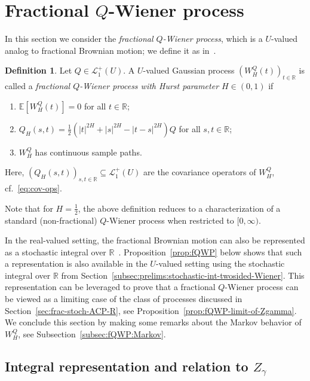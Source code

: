\documentclass[reqno]{amsart}
\numberwithin{equation}{section}
\newcommand{\bbR}{\mathbb{R}}
\newcommand{\R}{\mathbb{R}}
\newcommand{\E}{\mathbb{E}}
\newcommand{\LO}{\mathscr L}
\theoremstyle{remark}
\theoremstyle{definition}
\newtheorem{definition}[lemma]{Definition}
\begin{document}
\section{Fractional $Q$-Wiener process}
\label{sec:frac-QWiener}
In this section we consider the \emph{fractional $Q$-Wiener process}, 
which is a $U$-valued analog to 
fractional Brownian motion; 
we define it as in~\cite[Definition~2.1]{Duncan2002}.
%
\begin{definition}\label{def:fQWP}
	Let $Q \in \LO_1^+(U)$.
	A $U$-valued Gaussian process $(W^Q_H(t))_{t\in\R}$ is called a \emph{fractional $Q$-Wiener process
		with Hurst parameter $H \in (0, 1)$} if
	\begin{enumerate}[label=(f-WP\arabic*), leftmargin=1.6cm]
		\item $\E[W^Q_H(t)] = 0$ for all $t \in \bbR$; \label{item:fWP1}
		\item $Q_H(s,t) = \frac{1}{2}(|t|^{2H} + |s|^{2H} - |t-s|^{2H}) Q$ for all $s, t \in \R$;  \label{item:fWP2}
		\item $W^Q_H$ has continuous sample paths. \label{item:fWP3}
	\end{enumerate}
	Here, $(Q_{H}(s,t))_{s,t\in \R} \subseteq \mathscr L_1^+(U)$
	are the covariance operators of $W^Q_H$,
	cf.~\eqref{eq:cov-ops}.
\end{definition}
%
Note that for $H = \frac{1}{2}$, the above definition reduces to a characterization of a standard 
(non-fractional) $Q$-Wiener process when restricted to $[0,\infty)$.

In the real-valued setting, the fractional Brownian motion 
can also be represented as a stochastic integral over $\bbR$~\cite[Definition~2.1]{MandelbrotVanNess1968}.
Proposition~\ref{prop:fQWP} below
shows that such a representation is also available in the $U$-valued setting
using the stochastic integral over $\bbR$ from Section~\ref{subsec:prelims:stochastic-int-twosided-Wiener}.
This representation can be leveraged to prove that a fractional $Q$-Wiener process
can be viewed as a limiting case of the class of processes discussed in Section~\ref{sec:frac-stoch-ACP-R},
see Proposition~\ref{prop:fQWP-limit-of-Zgamma}.
We conclude this section by making some remarks about the Markov behavior of $W^Q_H$, see
Subsection~\ref{subsec:fQWP:Markov}.

\subsection{Integral representation and relation to $Z_\gamma$}
\end{document}
